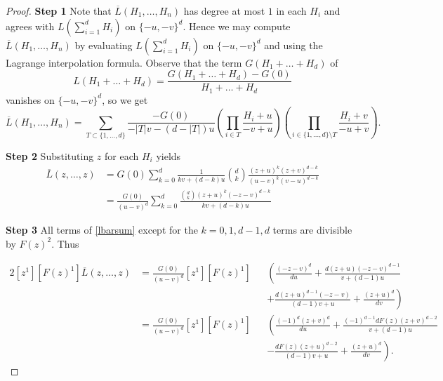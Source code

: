 \documentclass[12pt]{amsart}
\newcommand{\ol}{\overline}
\theoremstyle{plain}
\theoremstyle{definition}
\theoremstyle{remark}
\begin{document}
\begin{proof}
\textbf{Step 1} Note that $\ol{L}(H_1, \ldots, H_n)$ has degree at most $1$ in each $H_i$ and agrees with $L(\sum_{i=1}^d H_i)$ on $\{-u, -v\}^d$. Hence we may compute $\ol{L}(H_1, \ldots, H_n)$ by evaluating $L(\sum_{i=1}^d H_i)$ on $\{-u, -v\}^d$ and using the Lagrange interpolation formula.  Observe that the term $G(H_1 + \ldots + H_d)$ of \[L(H_1 + \ldots + H_d) = \frac{G(H_1 + \ldots + H_d) - G(0)}{H_1 + \ldots + H_d}\] vanishes on $\{-u, -v\}^d$, so we get
$$\ol{L}(H_1, \ldots, H_n) = \sum_{T \subset \{1,\ldots,d\}} \frac{-G(0)}{-|T| v - (d - |T|) u}\left(\prod_{i \in T} \frac{H_i + u}{-v + u}\right) \left(\prod_{i \in \{1, \ldots, d\} \setminus T} \frac{H_i + v}{-u + v}\right).$$

\textbf{Step 2}
Substituting $z$ for each $H_i$ yields
\begin{align}
\ol{L}(z, \ldots, z) &= G(0)\sum_{k=0}^d \frac{1}{kv+(d-k)u} \binom{d}{k} \frac{(z+u)^k(z+v)^{d-k}}{(u-v)^k(v-u)^{d-k}} \nonumber \\
&= \frac{G(0)}{(u - v)^d}\sum_{k=0}^d \frac{\binom{d}{k}(z+u)^k(-z-v)^{d-k}}{kv+(d-k)u}  \label{lbarsum}
\end{align}

\textbf{Step 3} All terms of \eqref{lbarsum} except for the $k=0,1,d-1,d$ terms are divisible by $F(z)^2$. Thus 

\begin{alignat}{2}
[z^1][F(z)^1] \ol{L}(z, \ldots, z)&=\frac{G(0)}{(u - v)^d}[z^1][F(z)^1]&&\left(\frac{(-z-v)^d}{du} + \frac{d(z+u)(-z-v)^{d-1}}{v+(d-1)u} \right. \nonumber \\
& && \left. + \frac{d(z+u)^{d-1}(-z-v)}{(d-1)v+u}+ \frac{(z+u)^d}{dv} \right)\nonumber \\
&=\frac{G(0)}{(u - v)^d}[z^1][F(z)^1] && \left(\frac{(-1)^d(z+v)^d}{du} + \frac{(-1)^{d-1}dF(z)(z+v)^{d-2}}{v+(d-1)u} \right. \label{lbarfourterms} \\
& &&\left. - \frac{dF(z)(z+u)^{d-2}}{(d-1)v+u}+ \frac{(z+u)^d}{dv} \right). \nonumber
\end{alignat}



\end{proof}
\end{document}
